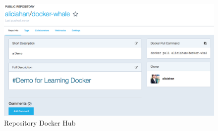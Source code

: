 \documentclass[12pt,a4paper]{article}
\begin{document}
\begin{figure}[h]
\begin{center}
  \includegraphics[scale=0.3]{dockerHub.png}
  \caption{Repository Docker Hub}
  \label{fig:2}
\end{center}
\end{figure}
 \FloatBarrier

\textbf{{\color{brown}{To Push an Image:}}}
\end{document}
